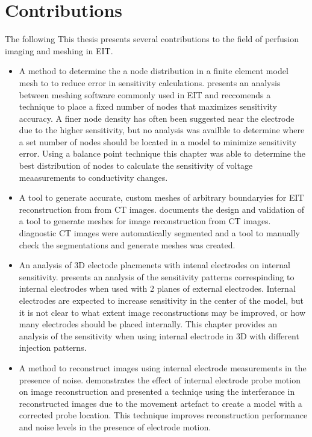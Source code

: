 \section{Contributions}
The following 
This thesis presents several contributions to the field of perfusion imaging and 
meshing in EIT.
\begin{itemize}
	\item A method to determine the a node distribution in a finite element model mesh to
        to reduce error in sensitivity calculations.  presents an 
        analysis between meshing software commonly used in EIT and reccomends a technique to 
        place a fixed number of nodes that maximizes sensitivity accuracy. 
        A finer node density has often been suggested near the electrode due to the higher 
        sensitivity, but no analysis was availble to determine where a set number of
        nodes should be located in a model to minimize sensitivity error. 
        Using a balance point 
        technique this chapter was able to determine the best distribution of nodes
        to calculate the sensitivity of voltage meaasurements to conductivity changes.
	\item A tool to generate accurate, custom meshes of arbitrary boundaryies for EIT reconstruction from 
        from CT images.  documents 
        the design and validation of a tool to generate meshes for image reconstruction from CT images. 
        diagnostic CT images were automatically segmented and a tool to manually check the segmentations
        and generate meshes was created. 
	\item An analysis of 3D electode placmenets with intenal electrodes on internal sensitivity. 
         presents an analysis of the sensitivity patterns correspinding to 
        internal electrodes when used with 2 planes of external electrodes. Internal electrodes are
        expected to increase sensitivity in the center of the model, but it is not clear to what extent 
        image reconstructions may be improved, or how many electrodes should be 
        placed internally. This chapter provides an analysis of the sensitivity when using internal
        electrode in 3D with different injection patterns.  
	\item A method to reconstruct images using internal electrode measurements in the presence of noise.
         demonstrates the effect of internal electrode probe motion on image 
        reconstruction and presented a techniqe using the interferance in reconstructed images 
        due to the movement artefact to create a model with a corrected probe location. This technique
        improves reconstruction performance and noise levels in the presence of electrode motion.
\end{itemize}

